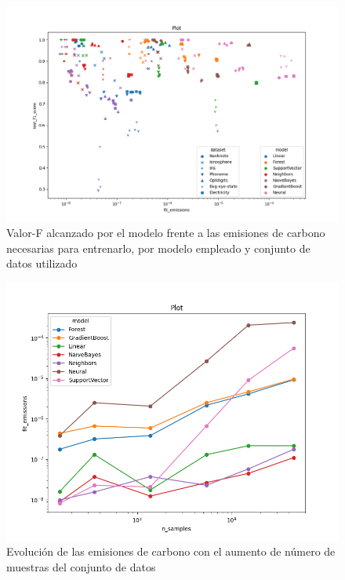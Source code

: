 \begin{figure}[H]
  \centerline{
     \includegraphics[width=1.2\textwidth, keepaspectratio]{img/graph/4scatter-dataset-model.png}
  }
  \caption{Valor-F alcanzado por el modelo frente a las emisiones de carbono necesarias para entrenarlo, por modelo empleado y conjunto de datos utilizado}
  \label{fig:scatter-1}
\end{figure}



\begin{figure}[H]
  \centerline{
     \includegraphics[width=1\textwidth, keepaspectratio]{img/graph/line-nsamples-emission-log.png}
  }
  \caption{Evolución de las emisiones de carbono con el aumento de número de muestras del conjunto de datos}
  \label{fig:line-samples}
\end{figure}


\clearpage